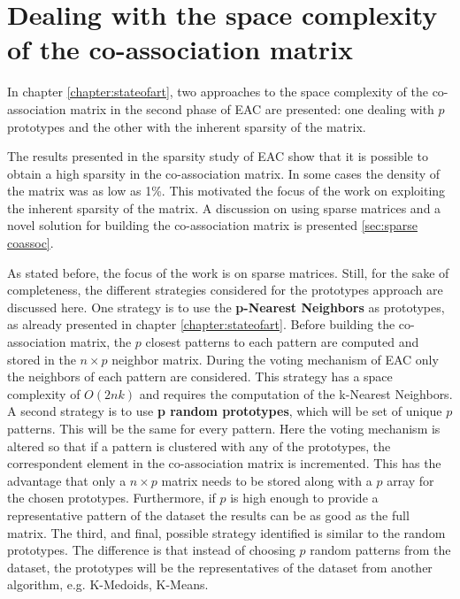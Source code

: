 
\section{Dealing with the space complexity of the co-association matrix}

In chapter \ref{chapter:stateofart}, two approaches to the space complexity of the co-association matrix in the second phase of EAC are presented: one dealing with $p$ prototypes and the other with the inherent sparsity of the matrix. 

The results presented in the sparsity study of EAC \cite{Lourenco2010} show that it is possible to obtain a high sparsity in the co-association matrix.
In some cases the density of the matrix was as low as 1\%.
This motivated the focus of the work on exploiting the inherent sparsity of the matrix.
A discussion on using sparse matrices and a novel solution for building the co-association matrix is presented \ref{sec:sparse coassoc}.

As stated before, the focus of the work is on sparse matrices.
Still, for the sake of completeness, the different strategies considered for the prototypes approach are discussed here.
One strategy is to use the \textbf{p-Nearest Neighbors} as prototypes, as already presented in chapter \ref{chapter:stateofart}.
Before building the co-association matrix, the $p$ closest patterns to each pattern are computed and stored in the $n \times p$ neighbor matrix.
During the voting mechanism of EAC only the neighbors of each pattern are considered.
This strategy has a space complexity of $O(2nk)$ and requires the computation of the k-Nearest Neighbors.
A second strategy is to use \textbf{p random prototypes}, which will be set of unique $p$ patterns.
This will be the same for every pattern.
Here the voting mechanism is altered so that if a pattern is clustered with any of the prototypes, the correspondent element in the co-association matrix is incremented.
This has the advantage that only a $n \times p$ matrix needs to be stored along with a $p$ array for the chosen prototypes.
Furthermore, if $p$ is high enough to provide a representative pattern of the dataset the results can be as good as the full matrix.
The third, and final, possible strategy identified is similar to the random prototypes.
The difference is that instead of choosing $p$ random patterns from the dataset, the prototypes will be the representatives of the dataset from another algorithm, e.g. K-Medoids, K-Means.

